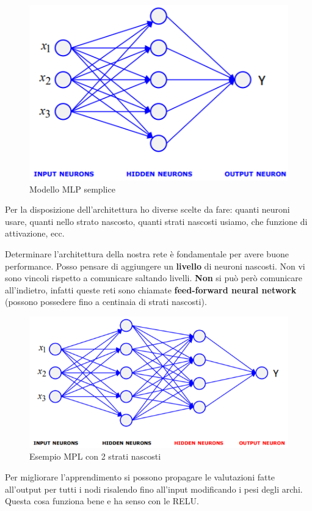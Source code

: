 \begin{figure}[H]
	\centering
	\includegraphics[height=0.5 \linewidth]{classification/pict/mlp_struct.png}
	\caption{Modello MLP semplice}
\end{figure}

Per la disposizione dell'architettura ho diverse scelte da fare: quanti neuroni usare, quanti nello strato nascosto, quanti strati nascosti usiamo, che funzione di attivazione, ecc.

Determinare l'architettura della nostra rete è fondamentale per avere buone performance. Posso pensare di aggiungere un \textbf{livello} di neuroni nascosti. Non vi sono vincoli rispetto a comunicare saltando livelli. \textbf{Non} si può però comunicare all'indietro, infatti queste reti sono chiamate \textbf{feed-forward neural network} (possono possedere fino a centinaia di strati nascosti).

\begin{figure}[H]
	\centering
	\includegraphics[width=0.9 \linewidth]{classification/pict/mlp_esempio.png}
	\caption{Esempio MPL con 2 strati nascosti}
\end{figure}

Per migliorare l'apprendimento si possono propagare le valutazioni fatte all'output per tutti i nodi risalendo fino all'input modificando i pesi degli archi. Questa cosa funziona bene e ha senso con le RELU.

